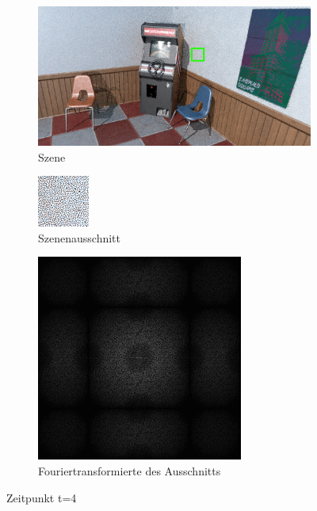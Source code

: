 \begin{figure}[H]
    \begin{subfigure}{\textwidth}  
        \centering \includegraphics[scale=.25]{content/TemporalerAlg/Bilder/Retargeting/Szene/Szene4.png}
        \caption{Szene}
        \label{fig:Retargeting_And_Sorting_Szene_t4}
    \end{subfigure}
    \begin{subfigure}{0.5\textwidth}
        \centering\includegraphics[width=0.4\linewidth]{content/TemporalerAlg/Bilder/Retargeting/Ausschnitt/Ausschnitt4.png} 
        \caption{Szenenausschnitt}
        \label{fig:Retargeting_And_Sorting_ausschnitt_t4}
    \end{subfigure}
    \begin{subfigure}{0.5\textwidth}
        \centering\includegraphics[width=0.4\linewidth]{content/TemporalerAlg/Bilder/Retargeting/Spektren/Ausschnitt4.png}
        \caption{Fouriertransformierte des Ausschnitts}
        \label{fig:Retargeting_And_Sorting_Fouriertransformierte_t4}
    \end{subfigure}
        \caption{Zeitpunkt t=4}
        \label{fig:Retargeting_And_Sorting_Verlauf_t4}
\end{figure}

